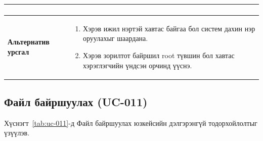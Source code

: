 \begin{table}[H]
\begin{tabular}{|p{3.8cm}|p{10.2cm}|}
\begin{enumerate}
        \end{enumerate}
        \\ \hline
        \textbf{Альтернатив урсгал} &
        \begin{enumerate}
            \item Хэрэв ижил нэртэй хавтас байгаа бол систем дахин нэр оруулахыг шаардана.
            \item Хэрэв зорилтот байршил root түвшин бол хавтас хэрэглэгчийн үндсэн орчинд үүснэ.
        \end{enumerate}
        \\ \hline
    \end{tabular}
\end{table}

\subsection{Файл байршуулах (UC-011)}

Хүснэгт~\ref{tab:uc-011}-д Файл байршуулах юзкейсийн дэлгэрэнгүй тодорхойлолтыг үзүүлэв.

